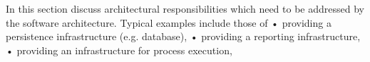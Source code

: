 In this section discuss architectural responsibilities which need to be addressed by the software
architecture. Typical examples include those of
• providing a persistence infrastructure (e.g. database),
• providing a reporting infrastructure,
• providing an infrastructure for process execution,